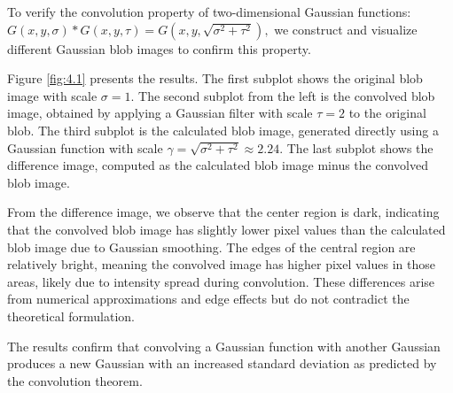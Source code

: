 \documentclass[12pt]{article}
\begin{document}
\FloatBarrier
To verify the convolution property of two-dimensional Gaussian functions:
    $G(x,y,\sigma) * G(x,y,\tau) = G(x,y, \sqrt{\sigma^2 + \tau^2}),
$
we construct and visualize different Gaussian blob images to confirm this property.

Figure \ref{fig:4.1} presents the results. The first subplot shows the original blob image with scale $\sigma = 1$. The second subplot from the left is the convolved blob image, obtained by applying a Gaussian filter with scale $\tau = 2$ to the original blob. The third subplot is the calculated blob image, generated directly using a Gaussian function with scale $\gamma = \sqrt{\sigma^2 + \tau^2} \approx 2.24$. The last subplot shows the difference image, computed as the calculated blob image minus the convolved blob image.

From the difference image, we observe that the center region is dark, indicating that the convolved blob image has slightly lower pixel values than the calculated blob image due to Gaussian smoothing. The edges of the central region are relatively bright, meaning the convolved image has higher pixel values in those areas, likely due to intensity spread during convolution. These differences arise from numerical approximations and edge effects but do not contradict the theoretical formulation.

The results confirm that convolving a Gaussian function with another Gaussian produces a new Gaussian with an increased standard deviation as predicted by the convolution theorem.
\end{document}
